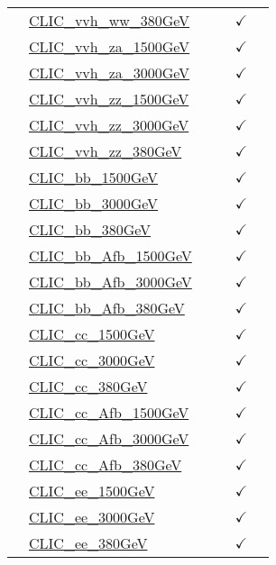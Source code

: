 \documentclass{article}
\begin{document}
\begin{longtable}{|c|l|c|c|c|c|}
 & \href{https://arxiv.org}{CLIC_vvh_ww_380GeV}  &  &  & $\checkmark$ & \\ \cline{2-6}
 & \href{https://arxiv.org}{CLIC_vvh_za_1500GeV}  &  &  & $\checkmark$ & \\ \cline{2-6}
 & \href{https://arxiv.org}{CLIC_vvh_za_3000GeV}  &  &  & $\checkmark$ & \\ \cline{2-6}
 & \href{https://arxiv.org}{CLIC_vvh_zz_1500GeV}  &  &  & $\checkmark$ & \\ \cline{2-6}
 & \href{https://arxiv.org}{CLIC_vvh_zz_3000GeV}  &  &  & $\checkmark$ & \\ \cline{2-6}
 & \href{https://arxiv.org}{CLIC_vvh_zz_380GeV}  &  &  & $\checkmark$ & \\ \cline{2-6}
 & \href{https://arxiv.org}{CLIC_bb_1500GeV}  &  &  & $\checkmark$ & \\ \cline{2-6}
 & \href{https://arxiv.org}{CLIC_bb_3000GeV}  &  &  & $\checkmark$ & \\ \cline{2-6}
 & \href{https://arxiv.org}{CLIC_bb_380GeV}  &  &  & $\checkmark$ & \\ \cline{2-6}
 & \href{https://arxiv.org}{CLIC_bb_Afb_1500GeV}  &  &  & $\checkmark$ & \\ \cline{2-6}
 & \href{https://arxiv.org}{CLIC_bb_Afb_3000GeV}  &  &  & $\checkmark$ & \\ \cline{2-6}
 & \href{https://arxiv.org}{CLIC_bb_Afb_380GeV}  &  &  & $\checkmark$ & \\ \cline{2-6}
 & \href{https://arxiv.org}{CLIC_cc_1500GeV}  &  &  & $\checkmark$ & \\ \cline{2-6}
 & \href{https://arxiv.org}{CLIC_cc_3000GeV}  &  &  & $\checkmark$ & \\ \cline{2-6}
 & \href{https://arxiv.org}{CLIC_cc_380GeV}  &  &  & $\checkmark$ & \\ \cline{2-6}
 & \href{https://arxiv.org}{CLIC_cc_Afb_1500GeV}  &  &  & $\checkmark$ & \\ \cline{2-6}
 & \href{https://arxiv.org}{CLIC_cc_Afb_3000GeV}  &  &  & $\checkmark$ & \\ \cline{2-6}
 & \href{https://arxiv.org}{CLIC_cc_Afb_380GeV}  &  &  & $\checkmark$ & \\ \cline{2-6}
 & \href{https://arxiv.org}{CLIC_ee_1500GeV}  &  &  & $\checkmark$ & \\ \cline{2-6}
 & \href{https://arxiv.org}{CLIC_ee_3000GeV}  &  &  & $\checkmark$ & \\ \cline{2-6}
 & \href{https://arxiv.org}{CLIC_ee_380GeV}  &  &  & $\checkmark$ & \\ \cline{2-6}

\end{longtable}
\end{document}
